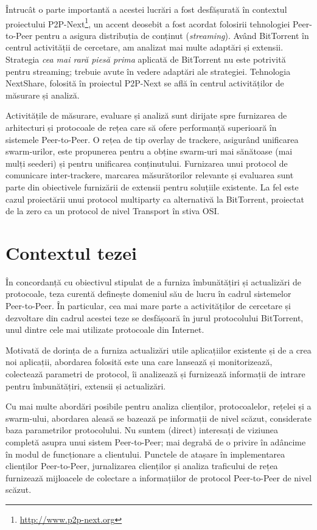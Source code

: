 Întrucât o parte importantă a acestei lucrări a fost desfășurată în contextul
proiectului P2P-Next\footnote{\url{http://www.p2p-next.org}}, un accent
deosebit a fost acordat folosirii tehnologiei Peer-to-Peer pentru a asigura
distribuția de conținut (\textit{streaming}). Având BitTorrent în centrul
activității de cercetare, am analizat mai multe adaptări și extensii.
Strategia \textit{cea mai rară piesă prima} aplicată de BitTorrent nu este
potrivită pentru streaming; trebuie avute în vedere adaptări ale strategiei.
Tehnologia NextShare, folosită în proiectul P2P-Next se află în centrul
activităților de măsurare și analiză.

Activitățile de măsurare, evaluare și analiză sunt dirijate spre furnizarea de
arhitecturi și protocoale de rețea care să ofere performanță superioară în
sistemele Peer-to-Peer. O rețea de tip overlay de trackere, asigurând
unificarea swarm-urilor, este propunerea pentru a obține swarm-uri mai
sănătoase (mai mulți seederi) și pentru unificarea conținutului. Furnizarea
unui protocol de comunicare inter-trackere, marcarea măsurătorilor relevante
și evaluarea sunt parte din obiectivele furnizării de extensii pentru
soluțiile existente. La fel este cazul proiectării unui protocol multiparty ca
alternativă la BitTorrent, proiectat de la zero ca un protocol de nivel
Transport în stiva OSI.

\section{Contextul tezei}
\label{sec:intro:scope}

În concordanță cu obiectivul stipulat de a furniza îmbunătățiri și actualizări
de protocoale, teza curentă definește domeniul său de lucru în
cadrul sistemelor Peer-to-Peer. În particular, cea mai mare parte a
activităților de cercetare și dezvoltare din cadrul acestei teze se desfășoară
în jurul protocolului BitTorrent, unul dintre cele mai utilizate protocoale
din Internet.

Motivată de dorința de a furniza actualizări utile aplicațiilor existente și
de a crea noi aplicații, abordarea folosită este una care lansează și
monitorizează, colectează parametri de protocol, îi analizează și furnizează
informații de intrare pentru îmbunătățiri, extensii și actualizări.

Cu mai multe abordări posibile pentru analiza clienților, protocoalelor,
rețelei și a swarm-ului, abordarea aleasă se bazează pe informații de nivel
scăzut, considerate baza parametrilor protocolului. Nu suntem (direct)
interesați de viziunea completă asupra unui sistem Peer-to-Peer; mai degrabă
de o privire în adâncime în modul de funcționare a clientului. Punctele de
atașare în implementarea clienților Peer-to-Peer, jurnalizarea clienților și
analiza traficului de rețea furnizează mijloacele de colectare a informațiilor
de protocol Peer-to-Peer de nivel scăzut.

